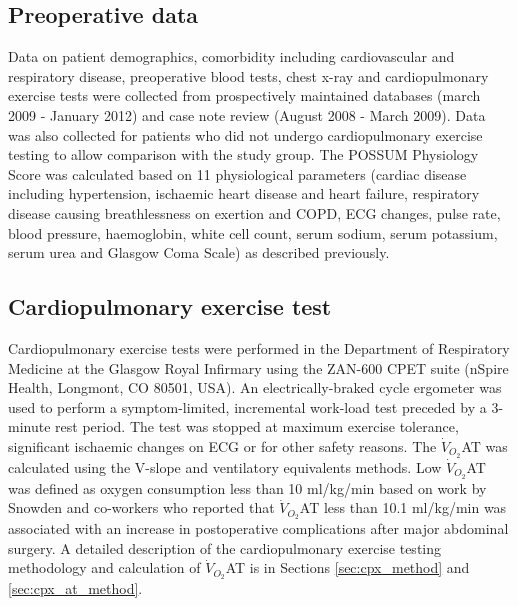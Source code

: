 \subsection{Preoperative data}
Data on patient demographics, comorbidity including cardiovascular and respiratory disease, preoperative blood tests, chest x-ray and cardiopulmonary exercise tests were collected from prospectively maintained databases (march 2009 - January 2012) and case note review (August 2008 - March 2009). 
Data was also collected for patients who did not undergo cardiopulmonary exercise testing to allow comparison with the study group. 
The POSSUM Physiology Score was calculated based on 11 physiological parameters (cardiac disease including hypertension, ischaemic heart disease and heart failure, respiratory disease causing breathlessness on exertion and COPD, ECG changes, pulse rate, blood pressure, haemoglobin, white cell count, serum sodium, serum potassium, serum urea and Glasgow Coma Scale) as described previously.

\subsection{Cardiopulmonary exercise test}
Cardiopulmonary exercise tests were performed in the Department of Respiratory Medicine at the Glasgow Royal Infirmary using the ZAN-600 CPET suite (nSpire Health, Longmont, CO 80501, USA). 
An electrically-braked cycle ergometer was used to perform a symptom-limited, incremental work-load test preceded by a 3-minute rest period. 
The test was stopped at maximum exercise tolerance, significant ischaemic changes on ECG or for other safety reasons. 
The $\dot{V}_{O_2}$AT was calculated using the V-slope \parencite{beaver_new_1986, sue_metabolic_1988} and ventilatory equivalents \parencite{sue_metabolic_1988} methods. 
Low $\dot{V}_{O_2}$AT was defined as oxygen consumption less than 10 ml/kg/min based on work by Snowden and co-workers \parencite{snowden_submaximal_2010} who reported that $\dot{V}_{O_2}$AT less than 10.1 ml/kg/min was associated with an increase in postoperative complications after major abdominal surgery.
A detailed description of the cardiopulmonary exercise testing methodology and calculation of $\dot{V}_{O_2}$AT is in Sections \ref{sec:cpx_method} and \ref{sec:cpx_at_method}.

